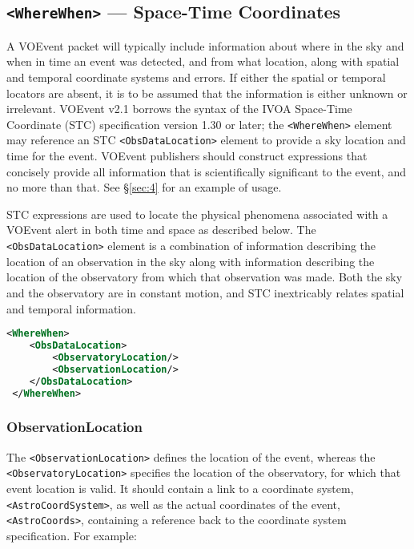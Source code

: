 \documentclass[11pt,a4paper]{ivoa}
\begin{document}
\subsection{\texttt{<WhereWhen>} --- Space-Time Coordinates}
\label{sec:3.4}

A VOEvent packet will typically include information about where in the sky and 
when in time an event was detected, and from what location, along with spatial 
and temporal coordinate systems and errors. If either the spatial or temporal 
locators are absent, it is to be assumed that the information is either unknown 
or irrelevant. VOEvent v2.1 borrows the syntax of the IVOA Space-Time Coordinate 
(STC) specification version 1.30 or later; the \texttt{<WhereWhen>} element may 
reference an STC \citep{2007ivoa.spec.1030R} \texttt{<ObsDataLocation>} element to 
provide a sky location and time for the event. VOEvent publishers should 
construct expressions that concisely provide all information that is 
scientifically significant to the event, and no more than that. See 
\S\ref{sec:4} for an example of usage. 

STC expressions are used to locate the physical phenomena associated with a 
VOEvent alert in both time and space as described below. The \texttt{
<ObsDataLocation>} element is a combination of information describing the 
location of an observation in the sky along with information describing the 
location of the observatory from which that observation was made. Both the sky 
and the observatory are in constant motion, and STC inextricably relates spatial 
and temporal information. 

\begin{lstlisting}[language=XML]
<WhereWhen>
    <ObsDataLocation>
        <ObservatoryLocation/>
        <ObservationLocation/>
    </ObsDataLocation>
 </WhereWhen>
\end{lstlisting}

\subsubsection{ObservationLocation}
\label{sec:3.4.1}

The \texttt{<ObservationLocation>} defines the location of the event, whereas
the \texttt{<ObservatoryLocation>} specifies the location of the observatory, 
for which that event location is valid. It should contain a link to a 
coordinate system, \texttt{<AstroCoordSystem>}, as well as the actual coordinates 
of the event, \texttt{<AstroCoords>}, containing a reference back to the 
coordinate system specification. For example: 
\end{document}
